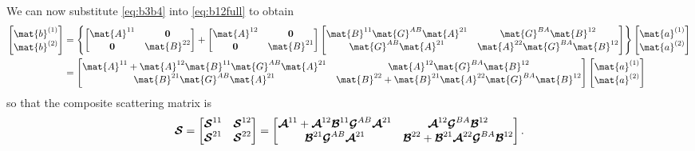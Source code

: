 We can now substitute \eqref{eq:b3b4} into \eqref{eq:b12full}
to obtain
\begin{align}
  \colvec{\mat{b}\one \\ \mat{b}\two}
  &=
  \left\{
    \begin{bmatrix}
      \mat{A}^{11} & \0 \\
      \0 & \mat{B}^{22}
    \end{bmatrix}
    +
    \begin{bmatrix}
      \mat{A}^{12} & \0 \\
      \0 & \mat{B}^{21}
    \end{bmatrix}
    \begin{bmatrix}
      \mat{B}^{11} \mat{G}^{AB} \mat{A}^{21} & \mat{G}^{BA} \mat{B}^{12} \\
      \mat{G}^{AB} \mat{A}^{21} & \mat{A}^{22} \mat{G}^{BA} \mat{B}^{12}
    \end{bmatrix}
  \right\}
  \colvec{\mat{a}\one \\ \mat{a}\two} \nonumber \\
  &=
  \begin{bmatrix}
    \mat{A}^{11} + \mat{A}^{12}\mat{B}^{11}\mat{G}^{AB}\mat{A}^{21} &
    \mat{A}^{12}\mat{G}^{BA}\mat{B}^{12} \\
    \mat{B}^{21}\mat{G}^{AB}\mat{A}^{21} & 
    \mat{B}^{22} + \mat{B}^{21}\mat{A}^{22} \mat{G}^{BA} \mat{B}^{12}
  \end{bmatrix}
  \colvec{\mat{a}\one \\ \mat{a}\two} \nonumber 
\end{align}
so that the composite scattering matrix is
\begin{equation}
  \label{eq:Scomposite}
  \boldsymbol{\mathcal{S}} = 
  \begin{bmatrix}
    \boldsymbol{\mathcal{S}}^{11} &   \boldsymbol{\mathcal{S}}^{12} \\
    \boldsymbol{\mathcal{S}}^{21} &   \boldsymbol{\mathcal{S}}^{22} 
  \end{bmatrix}
  =
  \begin{bmatrix}
    \boldsymbol{\mathcal{A}}^{11} + \boldsymbol{\mathcal{A}}^{12}\boldsymbol{\mathcal{B}}^{11}\boldsymbol{\mathcal{G}}^{AB}\boldsymbol{\mathcal{A}}^{21} &
    \boldsymbol{\mathcal{A}}^{12}\boldsymbol{\mathcal{G}}^{BA}\boldsymbol{\mathcal{B}}^{12} \\
    \boldsymbol{\mathcal{B}}^{21}\boldsymbol{\mathcal{G}}^{AB}\boldsymbol{\mathcal{A}}^{21} & 
    \boldsymbol{\mathcal{B}}^{22} + \boldsymbol{\mathcal{B}}^{21}\boldsymbol{\mathcal{A}}^{22} \boldsymbol{\mathcal{G}}^{BA} \boldsymbol{\mathcal{B}}^{12}
  \end{bmatrix}.
\end{equation}

